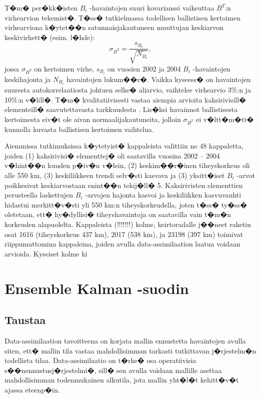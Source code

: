 \documentclass[12pt,a4paper,finnish,margin=2in]{article}
\begin{document}
T�m� per�kk�isten $B_i$ -havaintojen suuri kovarianssi vaikeuttaa $B^T$:n virhearvion tekemist�. T�ss� tutkielmassa todellisen ballistisen kertoimen virhearviona k�ytet��n satunnaisjakautuneen muuttujan keskiarvon keskivirhett� (esim. l�hde):
\begin{equation} \label{Bi_err_eq}
\sigma_{B^T} = \frac{s_{B_i}}{\sqrt{N_{B_i}}},
\end{equation}
jossa $\sigma_{B^T}$ on kertoimen virhe, $s_{B_i}$ on vuosien 2002 ja 2004 $B_i$ -havaintojen keskihajonta ja $N_{B_i}$ havaintojen lukum��r�. Vaikka kyseess� on havaintojen suuresta autokorrelaatiosta johtuen selke� aliarvio, vaihtelee virhearvio 3\%:n ja 10\%:n v�lill�. T�m� kvalitatiivisesti vastaa aiempia arvioita kaksirivisill� elementeill� saavutettavasta tarkkuudesta \citep[esim.][]{Doornbos_2007}. Lis�ksi havainnot ballistisesta kertoimesta eiv�t ole aivan normaalijakautuneita, jolloin $\sigma_{B^T}$ ei v�ltt�m�tt� kunnolla kuvasta ballistisen kertoimen vaihtelua. 

Aiemmissa tutkimuksissa k�ytetyist� kappaleista valittiin ne 48 kappaletta, joiden (1) kaksirivisi� elementtej� oli saatavilla vuosina 2002 -- 2004 v�hint��n kuuden p�iv�n v�lein, (2) keskim��r�inen tiheyskorkeus oli alle 550 km, (3) keskiliikkeen trendi selv�sti kasvava ja (3) yksitt�iset $B_i$ -arvot poikkesivat keskiarvostaan enint��n tekij�ll� 5. Kaksirivisten elementtien perusteella laskettujen $B_i$ -arvojen hajonta kasvoi ja keskiliikken kasvuvauhti hidastui merkitt�v�sti yli 550 km:n tiheyskorkeudella, joten t�ss� ty�ss� oletetaan, ett� hy�dyllisi� tiheyshavaintoja on saatavilla vain t�m�n korkeuden alapuolelta. Kappaleista (!!!!!!!) kolme, keirtoradalle j��neet raketin osat 1616 (tiheyskorkeus 437 km), 2017 (538 km), ja 23198 (397 km) toimivat riippumattomina kappaleina, joiden avulla data-assimilaation laatua voidaan arvioida. Kyseiset kolme ki


\section{Ensemble Kalman -suodin}

\subsection{Taustaa}

Data-assimilaation tavoitteena on korjata mallin ennustetta havaintojen avulla siten, ett� mallin tila vastaa mahdollisimman tarkasti tutkittavan j�rjestelm�n todellista tilaa. Data-assimilaatio on t�rke� osa operatiivisia s��nennustusj�rjestelmi�, sill� sen avulla voidaan mallille asettaa mahdollisimman todenmukainen alkutila, jota mallin yht�l�t kehitt�v�t ajassa eteenp�in. 
\end{document}
